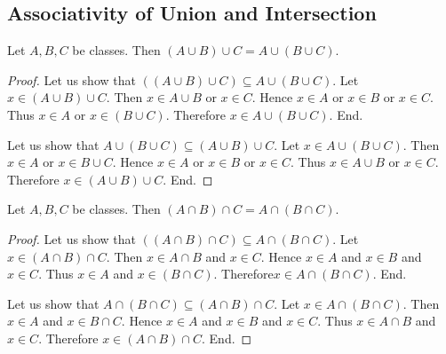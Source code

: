 \documentclass[10pt]{article}
\begin{document}
  \subsection*{Associativity of Union and Intersection}

  \begin{forthel}
    \begin{proposition}[id=FOUNDATIONS_02_3854032263184384,printid]
      Let $A, B, C$ be classes.
      Then $(A \cup B) \cup C = A \cup (B \cup C)$.
    \end{proposition}
    \begin{proof}
      Let us show that $((A \cup B) \cup C) \subseteq A \cup (B \cup C)$. %
        Let $x \in (A \cup B) \cup C$.
        Then $x \in A \cup B$ or $x \in C$.
        Hence $x \in A$ or $x \in B$ or $x \in C$.
        Thus $x \in A$ or $x \in (B \cup C)$.
        Therefore $x \in A \cup (B \cup C)$.
      End.

      Let us show that $A \cup (B \cup C) \subseteq (A \cup B) \cup C$.
        Let $x \in A \cup (B \cup C)$.
        Then $x \in A$ or $x \in B \cup C$.
        Hence $x \in A$ or $x \in B$ or $x \in C$.
        Thus $x \in A \cup B$ or $x \in C$.
        Therefore $x \in (A \cup B) \cup C$.
      End.
    \end{proof}
  \end{forthel}

  \begin{forthel}
    \begin{proposition}[id=FOUNDATIONS_02_906751977193472,printid]
      Let $A, B, C$ be classes.
      Then $(A \cap B) \cap C = A \cap (B \cap C)$.
    \end{proposition}
    \begin{proof}
      Let us show that $((A \cap B) \cap C) \subseteq A \cap (B \cap C)$. %
        Let $x \in (A \cap B) \cap C$.
        Then $x \in A \cap B$ and $x \in C$.
        Hence $x \in A$ and $x \in B$ and $x \in C$.
        Thus $x \in A$ and $x \in (B \cap C)$.
        Therefore$ x \in A \cap (B \cap C)$.
      End.

      Let us show that $A \cap (B \cap C) \subseteq (A \cap B) \cap C$.
        Let $x \in A \cap (B \cap C)$.
        Then $x \in A$ and $x \in B \cap C$.
        Hence $x \in A$ and $x \in B$ and $x \in C$.
        Thus $x \in A \cap B$ and $x \in C$.
        Therefore $x \in (A \cap B) \cap C$.
      End.
    \end{proof}
  \end{forthel}
\end{document}
